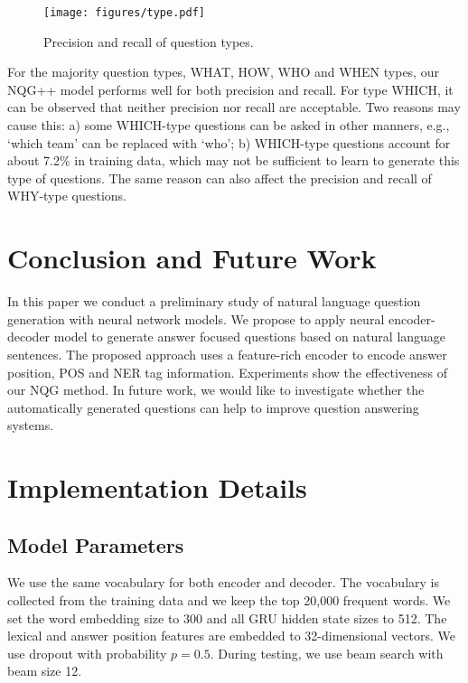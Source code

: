 \documentclass[11pt,letterpaper]{article}
\newcommand{\ourModelName}{NQG}
\begin{document}
\begin{figure}[ht]
	\centering
	\texttt{[image: figures/type.pdf]}
	\caption{\label{fig:type}Precision and recall of question types.
	}
\end{figure}

For the majority question types, WHAT, HOW, WHO and WHEN types, our \ourModelName{}++ model performs well for both precision and recall.
For type WHICH, it can be observed that neither precision nor recall are acceptable.
Two reasons may cause this: a) some WHICH-type questions can be asked in other manners, e.g., `which team' can be replaced with `who'; b) WHICH-type questions account for about 7.2\% in training data, which may not be sufficient to learn to generate this type of questions. The same reason can also affect the precision and recall of WHY-type questions.






 
\section{Conclusion and Future Work}
In this paper we conduct a preliminary study of natural language question generation with neural network models.
We propose to apply neural encoder-decoder model to generate answer focused questions based on natural language sentences.
The proposed approach uses a feature-rich encoder to encode answer position, POS and NER tag information.
Experiments show the effectiveness of our \ourModelName{} method.
In future work, we would like to investigate whether the automatically generated questions can help to improve question answering systems.



\appendix



\section{Implementation Details}

\subsection{Model Parameters}
We use the same vocabulary for both encoder and decoder.
The vocabulary is collected from the training data and we keep the top 20,000 frequent words.
We set the word embedding size to 300 and all GRU hidden state sizes to 512.
The lexical and answer position features are embedded to 32-dimensional vectors.
We use dropout \citep{srivastava2014dropout} with probability $ p = 0.5 $.
During testing, we use beam search with beam size 12.
\end{document}
